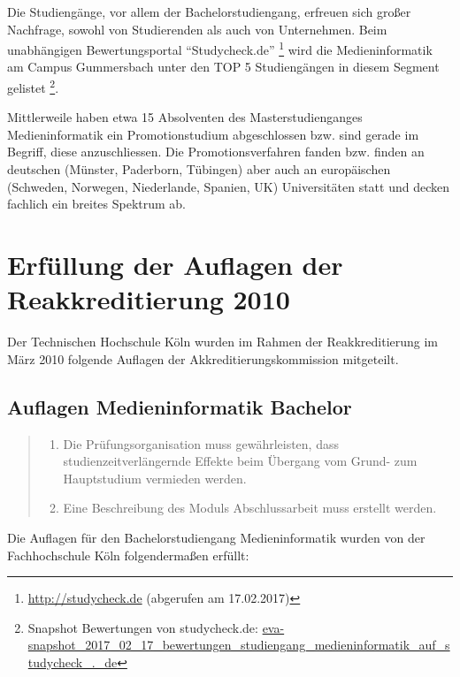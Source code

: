 Die Studiengänge, vor allem der Bachelorstudiengang, erfreuen sich
großer Nachfrage, sowohl von Studierenden als auch von Unternehmen. Beim
unabhängigen Bewertungsportal ``Studycheck.de'' \footnote{\url{http://studycheck.de}
  (abgerufen am 17.02.2017)} wird die Medieninformatik am Campus
Gummersbach unter den TOP 5 Studiengängen in diesem Segment gelistet
\footnote{Snapshot Bewertungen von studycheck.de:
  \href{../anhaenge/eva-snapshot_2017_02_17_bewertungen_studiengang_medieninformatik_auf_studycheck_._de}{eva-snapshot\_2017\_02\_17\_bewertungen\_studiengang\_medieninformatik\_auf\_studycheck\_.\_de}}.

Mittlerweile haben etwa 15 Absolventen des Masterstudienganges
Medieninformatik ein Promotionstudium abgeschlossen bzw. sind gerade im
Begriff, diese anzuschliessen. Die Promotionsverfahren fanden bzw.
finden an deutschen (Münster, Paderborn, Tübingen) aber auch an
europäischen (Schweden, Norwegen, Niederlande, Spanien, UK)
Universitäten statt und decken fachlich ein breites Spektrum ab.

\section{Erfüllung der Auflagen der Reakkreditierung
2010}\label{erfuxfcllung-der-auflagen-der-reakkreditierung-2010}

Der Technischen Hochschule Köln wurden im Rahmen der Reakkreditierung im
März 2010 folgende Auflagen der Akkreditierungskommission mitgeteilt.

\subsection{Auflagen Medieninformatik
Bachelor}\label{auflagen-medieninformatik-bachelor}

\begin{quote}
\begin{enumerate}
\def\labelenumi{\arabic{enumi}.}
\tightlist
\item
  Die Prüfungsorganisation muss gewährleisten, dass
  studienzeitverlängernde Effekte beim Übergang vom Grund- zum
  Hauptstudium vermieden werden.
\item
  Eine Beschreibung des Moduls Abschlussarbeit muss erstellt werden.
\end{enumerate}
\end{quote}

Die Auflagen für den Bachelorstudiengang Medieninformatik wurden von der
Fachhochschule Köln folgendermaßen erfüllt:

